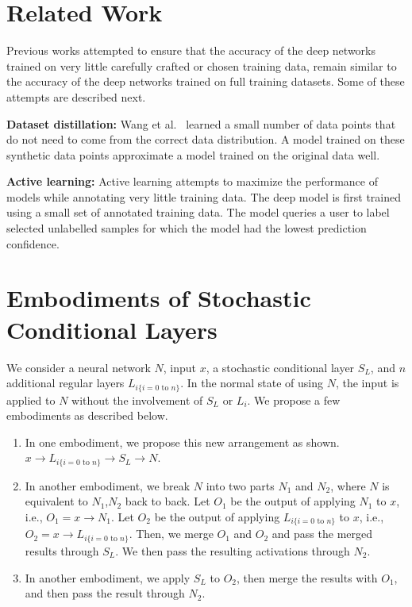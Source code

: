 \documentclass[12pt, letterpaper]{article}
\begin{document}
\section{Related Work}
Previous works attempted to ensure that the accuracy of the deep networks trained on very little carefully crafted or chosen training data, remain similar to the accuracy of the deep networks trained on full training datasets. Some of these attempts are described next.

\noindent \textbf{Dataset distillation:} Wang et al.~\cite{datasetdistillation} learned a small number of data points that do not need to come from the correct data distribution.  A model trained on these synthetic data points approximate a model trained on the original data well.

\noindent \textbf{Active learning:} Active learning \cite{al1,al2,al3,al4} attempts to maximize the performance of models while annotating very little training data. The deep model is first trained using a small set of annotated training data.  The model queries a user to label selected unlabelled samples for which the model had the lowest prediction confidence. 

\section{Embodiments of Stochastic Conditional Layers}
\label{sec:embodiments}
We consider a neural network $N$, input $x$, a stochastic conditional layer $S_L$, and $n$ additional regular layers $L_{i\text{\{$i=0$ to $n$\}}}$. In the normal state of using $N$, the input is applied to $N$ without the involvement of $S_L$ or $L_i$. We propose a few embodiments as described below.
\begin{enumerate}
    \item In one embodiment, we propose this new arrangement as shown. $x \rightarrow L_{i\text{\{$i=0$ to $n$\}}} \rightarrow S_L \rightarrow N$.
    \item In another embodiment, we break $N$ into two parts $N_1$ and $N_2$, where $N$ is equivalent to $N_1$,$N_2$ back to back. Let $O_1$ be the output of applying $N_1$ to $x$, i.e., $O_1 = x \rightarrow N_1$. Let $O_2$ be the output of applying $L_{i\text{\{$i=0$ to $n$\}}}$ to $x$, i.e., $O_2 = x \rightarrow L_{i\text{\{$i=0$ to $n$\}}}$. Then, we merge $O_1$ and $O_2$ and pass the merged results through $S_L$. We then pass the resulting activations through $N_2$.
    \item In another embodiment, we apply $S_L$ to $O_2$, then merge the results with $O_1$, and then pass the result through $N_2$.
    
\end{enumerate}

{\small


}
\end{document}
